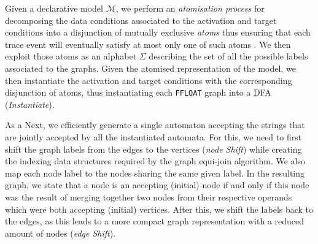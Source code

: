\documentclass[sigconf]{acmart}
\begin{document}
Given a declarative model $\mathcal{M}$, %
we %
perform an \textit{atomisation process} for %
decomposing the data conditions associated to the activation and target conditions into a disjunction of mutually exclusive \textit{atoms} thus ensuring that each trace event will eventually satisfy at most only one of such atoms  \cite{DBLP:conf/bpm/BergamiMMM21}. We then exploit those atoms as an alphabet $\Sigma$ describing the set of all the possible labels associated to the graphs. %
Given the atomised representation of the model, we then instantiate the activation and target conditions with the corresponding disjunction of atoms, thus instantiating each \texttt{FFLOAT} graph into a DFA (\textit{Instantiate}). 


As a 
Next, %
we %
efficiently generate a single automaton accepting the strings that are jointly accepted by all the instantiated automata. For this, we need to first shift the graph labels from the edges to the vertices (\textit{node Shift}) while creating the indexing data structures required by the graph equi-join algorithm. We also map each node label to the nodes sharing the same given label. In the resulting graph, we state that a node is an accepting (initial) node if and only if this node was the result of merging together two nodes from their respective operands which were both accepting (initial) vertices. After this, we shift the labels back to the edges, as this leads to a more compact graph representation with a reduced amount of nodes (\textit{edge Shift}).

%


\end{document}
